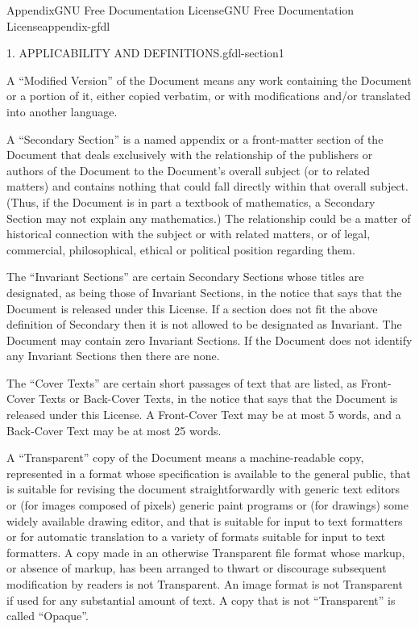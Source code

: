 \documentclass[oneside,10pt,]{book}
\numberwithin{equation}{section}
\begin{document}
\begin{appendixptx}{Appendix}{GNU Free Documentation License}{}{GNU Free Documentation License}{}{}{appendix-gfdl}
\begin{paragraphs}{1. APPLICABILITY AND DEFINITIONS.}{gfdl-section1}
\par
A ``Modified Version'' of the Document means any work containing the Document or a portion of it, either copied verbatim, or with modifications and\slash{}or translated into another language.%
\par
A ``Secondary Section'' is a named appendix or a front-matter section of the Document that deals exclusively with the relationship of the publishers or authors of the Document to the Document's overall subject (or to related matters) and contains nothing that could fall directly within that overall subject. (Thus, if the Document is in part a textbook of mathematics, a Secondary Section may not explain any mathematics.) The relationship could be a matter of historical connection with the subject or with related matters, or of legal, commercial, philosophical, ethical or political position regarding them.%
\par
The ``Invariant Sections'' are certain Secondary Sections whose titles are designated, as being those of Invariant Sections, in the notice that says that the Document is released under this License. If a section does not fit the above definition of Secondary then it is not allowed to be designated as Invariant. The Document may contain zero Invariant Sections. If the Document does not identify any Invariant Sections then there are none.%
\par
The ``Cover Texts'' are certain short passages of text that are listed, as Front-Cover Texts or Back-Cover Texts, in the notice that says that the Document is released under this License. A Front-Cover Text may be at most 5 words, and a Back-Cover Text may be at most 25 words.%
\par
A ``Transparent'' copy of the Document means a machine-readable copy, represented in a format whose specification is available to the general public, that is suitable for revising the document straightforwardly with generic text editors or (for images composed of pixels) generic paint programs or (for drawings) some widely available drawing editor, and that is suitable for input to text formatters or for automatic translation to a variety of formats suitable for input to text formatters. A copy made in an otherwise Transparent file format whose markup, or absence of markup, has been arranged to thwart or discourage subsequent modification by readers is not Transparent. An image format is not Transparent if used for any substantial amount of text. A copy that is not ``Transparent'' is called ``Opaque''.%
\par

\end{paragraphs}
\end{appendixptx}
\end{document}
